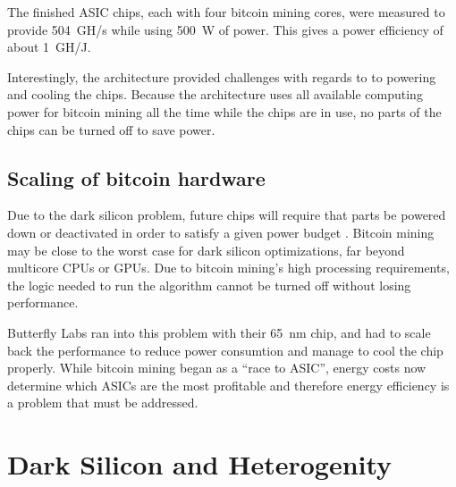 The finished ASIC chips, each with four bitcoin mining cores, were measured to provide 504~GH/s while using
500~W of power. This gives a power efficiency of about 1~GH/J.

Interestingly, the architecture provided challenges with regards to to powering and cooling the chips.
Because the architecture uses all available computing power for bitcoin mining all the time while
the chips are in use, no parts of the chips can be turned off to save power. \cite{goldstrike}


\subsection{Scaling of bitcoin hardware}
Due to the dark silicon problem, future chips will require that parts be powered down or deactivated
in order to satisfy a given power budget \cite{dark-silicon2}. Bitcoin mining may be close to
the worst case for dark silicon optimizations, far beyond multicore CPUs or GPUs. Due to bitcoin
mining's high processing requirements, the logic needed to run the algorithm cannot be turned off without losing
performance.

Butterfly Labs ran into this problem with their 65~nm chip, and had to scale back the performance to reduce power consumtion
and manage to cool the chip properly. While bitcoin mining began as a ``race to ASIC'', energy costs now determine
which ASICs are the most profitable and therefore energy efficiency is a problem that must be addressed. \cite{bespoke-silicon}

%


\section{Dark Silicon and Heterogenity}
\label{sec:dark-silicon}

